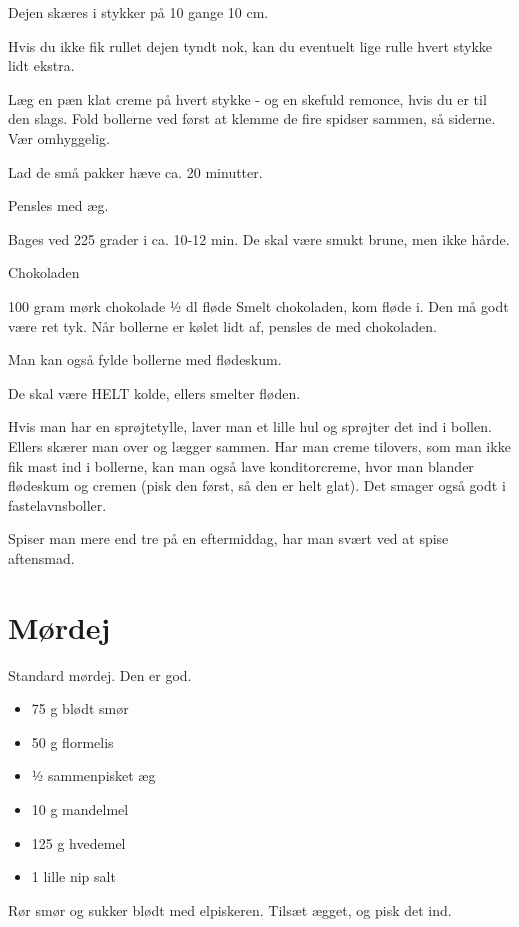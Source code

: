 \documentclass[
]{book}
\providecommand{\tightlist}{%
  \setlength{\itemsep}{0pt}\setlength{\parskip}{0pt}}
\begin{document}
Dejen skæres i stykker på 10 gange 10 cm.

Hvis du ikke fik rullet dejen tyndt nok, kan du eventuelt lige rulle hvert stykke lidt ekstra.

Læg en pæn klat creme på hvert stykke - og en skefuld remonce, hvis du er til den slags. Fold bollerne ved først at klemme de fire spidser sammen, så siderne. Vær omhyggelig.

Lad de små pakker hæve ca. 20 minutter.

Pensles med æg.

Bages ved 225 grader i ca. 10-12 min. De skal være smukt brune, men ikke hårde.

Chokoladen

100 gram mørk chokolade ½ dl fløde Smelt chokoladen, kom fløde i. Den må godt være ret tyk. Når bollerne er kølet lidt af, pensles de med chokoladen.

Man kan også fylde bollerne med flødeskum.

De skal være HELT kolde, ellers smelter fløden.

Hvis man har en sprøjtetylle, laver man et lille hul og sprøjter det ind i bollen. Ellers skærer man over og lægger sammen. Har man creme tilovers, som man ikke fik mast ind i bollerne, kan man også lave konditorcreme, hvor man blander flødeskum og cremen (pisk den først, så den er helt glat). Det smager også godt i fastelavnsboller.

Spiser man mere end tre på en eftermiddag, har man svært ved at spise aftensmad.

\hypertarget{muxf8rdej}{%
\section{Mørdej}\label{muxf8rdej}}

Standard mørdej. Den er god.

\begin{itemize}
\tightlist
\item
  75 g blødt smør
\item
  50 g flormelis
\item
  1⁄2 sammenpisket æg
\item
  10 g mandelmel
\item
  125 g hvedemel
\item
  1 lille nip salt
\end{itemize}

Rør smør og sukker blødt med elpiskeren. Tilsæt ægget, og pisk det ind.
\end{document}
